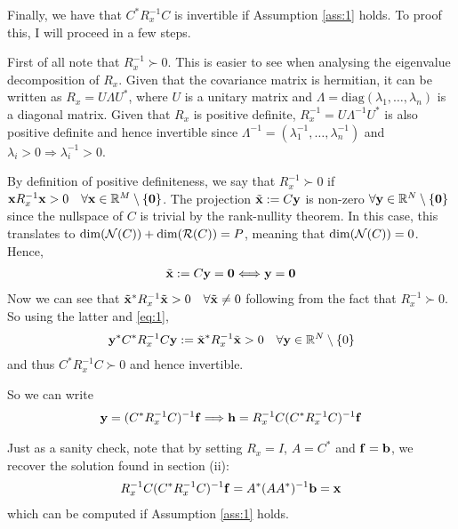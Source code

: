 \documentclass{article}
\begin{document}
\begin{enumerate}[label=(\roman*)]
        Finally, we have that $C^* R_x^{-1} C$ is invertible if Assumption \ref{ass:1} holds. To proof this, I will proceed in a few steps.
        
        First of all note that $R_x^{-1} \succ 0$. This is easier to see when analysing the eigenvalue decomposition of $R_x$. Given that the covariance matrix is hermitian, it can be written as $R_x = U \Lambda U^*$, where $U$ is a unitary matrix and $\Lambda = \text{diag}(\lambda_1,\dots, \lambda_n)$ is a diagonal matrix. Given that $R_x$ is positive definite, $R_x^{-1} = U \Lambda^{-1} U^*$ is also positive definite and hence invertible since $\Lambda^{-1} = (\lambda_1^{-1},\dots, \lambda_n^{-1})$ and $\lambda_i > 0 \Longrightarrow \lambda_i^{-1} > 0$.
        
        By definition of positive definiteness, we say that $R_x^{-1}\succ 0$ if $\mathbf{x} R_x^{-1} \mathbf{x} > 0\quad \forall \mathbf{x} \in \mathbb{R}^M \setminus \{\mathbf{0}\}$. The projection $\tilde{\mathbf{x}} := C \mathbf{y}$ is non-zero $\forall \mathbf{y} \in \mathbb{R}^N \setminus \{\mathbf{0}\}$ since the nullspace of $C$ is trivial by the rank-nullity theorem. In this case, this translates to $\dim(\mathcal{N}(C))+ \dim(\mathcal{R}(C))=P$, meaning that $\dim(\mathcal{N}(C))=0$. Hence,
        \begin{align}
        \tilde{\mathbf{x}}  := C \mathbf{y} = \mathbf{0} \Longleftrightarrow \mathbf{y} = \mathbf{0} \label{eq:1}
        \end{align}
        Now we can see that $\tilde{\mathbf{x}}^* R_x^{-1} \tilde{\mathbf{x}} > 0\quad \forall \tilde{\mathbf{x}} \neq 0$ following from the fact that $R_x^{-1} \succ 0$. So using the latter and \eqref{eq:1},
        \begin{align}
        \mathbf{y}^* C^* R_x^{-1} C \mathbf{y}:=\tilde{\mathbf{x}}^* R_x^{-1} \tilde{\mathbf{x}} > 0\quad \forall \mathbf{y} \in \mathbb{R}^N \setminus \{0\}
        \end{align}
        and thus $C^* R_x^{-1} C \succ 0$ and hence invertible.
        
        So we can write
        \begin{align}
            \mathbf{y} = (C^* R_x^{-1} C)^{-1} \mathbf{f} \Longrightarrow \mathbf{h} = R_x^{-1} C (C^* R_x^{-1} C)^{-1} \mathbf{f}
        \end{align}
        
        Just as a sanity check, note that by setting $R_x = I$, $A = C^*$ and $\mathbf{f} = \mathbf{b}$, we recover the solution found in section (ii):
        \begin{align}
            R_x^{-1} C (C^* R_x^{-1} C)^{-1} \mathbf{f} = A^* (A A^*)^{-1} \mathbf{b} = \mathbf{x}
        \end{align}
        which can be computed if Assumption \ref{ass:1} holds.
        

\end{enumerate}
\end{document}
